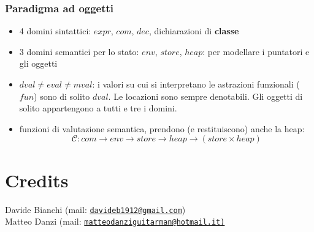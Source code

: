 \documentclass[a4paper, 10pt]{article}
\newcommand{\mail}[1]{\href{mailto:#1}{\texttt{#1}}}
\begin{document}
		\subsubsection{Paradigma ad oggetti}
			\begin{itemize}
				\item 4 domini sintattici: $ expr $, $ com $, $ dec $, dichiarazioni di \textbf{classe}
				\item 3 domini semantici per lo stato: $ env $, $ store $, $ heap $: per modellare i puntatori e gli oggetti
				\item $ dval \neq eval \neq mval $: i valori su cui si interpretano le astrazioni funzionali 
				($ fun $) sono di solito $ dval $. Le locazioni sono sempre denotabili. Gli oggetti di solito appartengono a tutti e tre i domini.
				\item funzioni di valutazione semantica, prendono (e restituiscono)
				anche la heap: 
				\[
					\mathcal{C}: com \to env \to store \to heap \to (store \times heap)
				\]
			\end{itemize}
	\section{Credits}
	Davide Bianchi (mail: \mail{davideb1912@gmail.com}) \\
	Matteo Danzi (mail: \mail{matteodanziguitarman@hotmail.it)}
	
\end{document}
